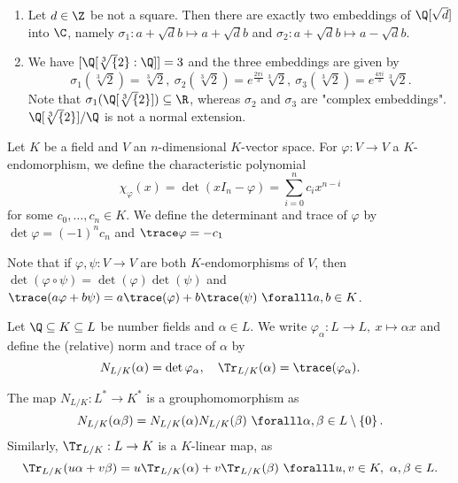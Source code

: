 \begin{exmp*}
	\begin{enumerate}
		\item Let \( d \in \Z \) be not a square.
			Then there are exactly two embeddings of \( \Q[\sqrt{d}] \) into \( \C \), namely \( \sigma_1: a+\sqrt{d}b \mapsto a + \sqrt{d}b \) and \( \sigma_2: a+\sqrt{d}b \mapsto a - \sqrt{d}b \).
		\item We have \( [\Q[\sqrt[3]{2}:\Q]] = 3 \) and the three embeddings are given by 
			\[ \sigma_1(\sqrt[3]{2}) = \sqrt[3]{2},\ \sigma_2(\sqrt[3]{2}) = e^\frac{2\pi i}{3}\sqrt[3]{2},\ \sigma_3(\sqrt[3]{2}) = e^\frac{4\pi i}{3}\sqrt[3]{2}. \]
			Note that \( \sigma_1(\Q[\sqrt[3]{2}]) \subseteq \R \), whereas \( \sigma_2 \) and \( \sigma_3 \) are "complex embeddings".
			\( \Q[\sqrt[3]{2}] / \Q \) is not a normal extension.
	\end{enumerate}
\end{exmp*}

\begin{defn*}
	Let \( K \) be a field and \( V \) an \( n \)-dimensional \( K \)-vector space.
	For \( \varphi: V \to V \) a \( K \)-endomorphism, we define the characteristic polynomial \[ \chi_\varphi(x) = \det(xI_n - \varphi) = \sum_{i=0}^{n} c_i x^{n-i} \]
	for some \( c_0, \dotsc, c_n \in K \).
	We define the determinant and trace of \( \varphi \) by \( \det \varphi = (-1)^n c_n \) and \( \trace\varphi = -c_1 \)
\end{defn*}

Note that if \( \varphi,\psi: V \to V \) are both \( K \)-endomorphisms of \( V \), then \( \det(\varphi \circ \psi) = \det(\varphi)\det(\psi) \) and \( \trace(a\varphi + b\psi) = a \trace(\varphi) + b \trace(\psi)\ \foralll a,b \in K \).

\begin{defn*}
	Let \( \Q \subseteq K \subseteq L \) be number fields and \( \alpha \in L \).
	We write \( \varphi_\alpha: L \to L,\ x \mapsto \alpha x \) and define the (relative) norm and trace of \( \alpha \) by
	\[ N_{L/K}(\alpha) = \det \varphi_\alpha,\quad \Tr_{L/K}(\alpha) = \trace(\varphi_\alpha). \]
\end{defn*}

\begin{rem*}
	The map \( N_{L/K}: L^* \to K^* \) is a grouphomomorphism as
	\[ N_{L/K}(\alpha\beta) = N_{L/K}(\alpha) N_{L/K}(\beta)\ \foralll \alpha,\beta \in L\setminus \{0\} \,. \]
	Similarly, \( \Tr_{L/K}: L \to K \) is a \( K \)-linear map, as
	\[ \Tr_{L/K}(u\alpha + v\beta) = u\Tr_{L/K}(\alpha) + v\Tr_{L/K}(\beta)\ \foralll u,v \in K,\ \alpha,\beta \in L. \]
\end{rem*}

